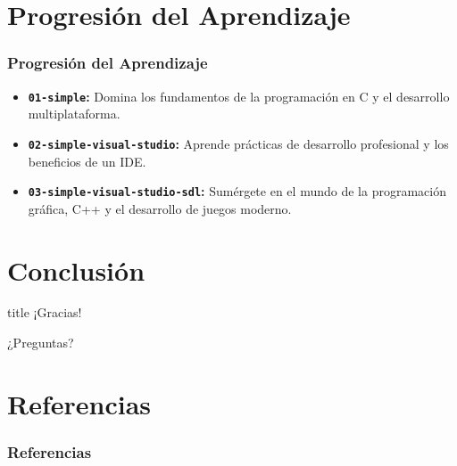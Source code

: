 \documentclass[]{beamer}
\begin{document}
\section{Progresión del Aprendizaje}
\begin{frame}
  \frametitle{Progresión del Aprendizaje}
  \begin{itemize}
    \item \textbf{\texttt{01-simple}:} Domina los fundamentos de la programación en C y el desarrollo multiplataforma.
    \item \textbf{\texttt{02-simple-visual-studio}:} Aprende prácticas de desarrollo profesional y los beneficios de un IDE.
    \item \textbf{\texttt{03-simple-visual-studio-sdl}:} Sumérgete en el mundo de la programación gráfica, C++ y el desarrollo de juegos moderno.
  \end{itemize}
\end{frame}

\section{Conclusión}
\begin{frame}
  \begin{center}
    \begin{beamercolorbox}[sep=8pt,center]{title}
      \Large{¡Gracias!}
    \end{beamercolorbox}
    \vspace{1em}
    \huge{¿Preguntas?}\\
    \vspace{1em}
    \small{\email}

  \end{center}
\end{frame}

{
\section{Referencias}
\begin{frame}[allowframebreaks]
  \frametitle{Referencias}
  
  
\end{frame}
}
\end{document}

